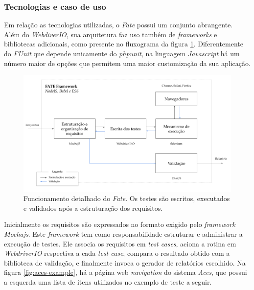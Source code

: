 \hypertarget{tecnologias-e-caso-de-uso}{%
\subsubsection{Tecnologias e caso de uso}\label{tecnologias-e-caso-de-uso}}

Em relação as tecnologias utilizadas, o \emph{Fate} possui um conjunto abrangente. Além do \emph{WebdiverIO}, sua arquitetura faz uso também de \emph{frameworks} e bibliotecas adicionais, como presente no fluxograma da figura \ref{fig:fate-framework}. Diferentemente do \emph{FUnit} que depende unicamente do \emph{phpunit}, na linguagem \emph{Javascript} há um número maior de opções que permitem uma maior customização da sua aplicação.

\begin{figure}[H]
    \centering
    \includegraphics[width=15cm]{source/4-solucao/images/fate-framework.png}
    \caption{Funcionamento detalhado do \emph{Fate}. Os testes são escritos, executados e validados após a estruturação dos requisitos.}
    \label{fig:fate-framework}
\end{figure}

Inicialmente os requisitos são expressados no formato exigido pelo \emph{framework Mochajs}. Este \emph{framework} tem como responsabilidade estruturar e administrar a execução de testes. Ele associa os requisitos em \emph{test cases}, aciona a rotina em \emph{WebdriverIO} respectiva a cada \emph{test case}, compara o resultado obtido com a biblioteca de validação, e finalmente invoca o gerador de relatórios escolhido. Na figura \ref{fig:aces-example}, há a página web \emph{navigation} do sistema \emph{Aces}, que possui a esquerda uma lista de itens utilizados no exemplo de teste a seguir.

